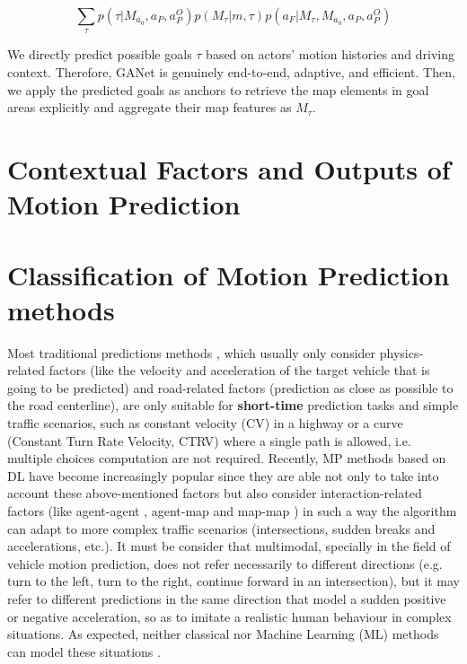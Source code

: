 \begin{equation}
	\sum _{\tau}{p(\tau|M_{a_0}, a_P, a^O_P) p(M_{\tau}|m, \tau)p(a_F|M_{\tau},M_{a_0}, a_P, a^O_P)}
\end{equation}

We directly predict possible goals $\tau$ based on actors' motion histories and driving context. Therefore, GANet is genuinely end-to-end, adaptive, and efficient. 
Then, we apply the predicted goals as anchors to retrieve the map elements in goal areas explicitly and aggregate their map features as $M_{\tau}$.

\section{Contextual Factors and Outputs of Motion Prediction}
\label{sec:2_contextual_factors_and_outputs_mp}

\section{Classification of Motion Prediction methods}
\label{sec:2_contextual_factors}



Most traditional predictions methods \cite{huang2022survey}, which usually only consider physics-related factors (like the velocity and acceleration of the target vehicle that is going to be predicted) and road-related factors (prediction as close as possible to the road centerline), are only suitable for \textbf{short-time} prediction tasks \cite{huang2022survey} and simple traffic scenarios, such as constant velocity (CV) in a highway or a curve (Constant Turn Rate Velocity, CTRV) where a single path is allowed, i.e. multiple choices computation are not required. Recently, MP methods based on DL have become increasingly popular since they are able not only to take into account these above-mentioned factors but also consider interaction-related factors (like agent-agent \cite{gupta2018social}, agent-map \cite{casas2018intentnet} and map-map \cite{liang2020learning}) in such a way the algorithm can adapt to more complex traffic scenarios (intersections, sudden breaks and accelerations, etc.). It must be consider that multimodal, specially in the field of vehicle motion prediction, does not refer necessarily to different directions (e.g. turn to the left, turn to the right, continue forward in an intersection), but it may refer to different predictions in the same direction that model a sudden positive or negative acceleration, so as to imitate a realistic human behaviour in complex situations. As expected, neither classical nor Machine Learning (ML) methods can model these situations \cite{huang2022survey}.

